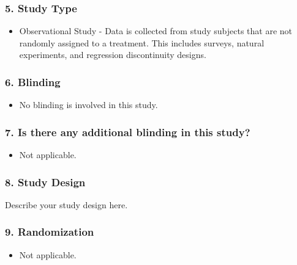 \documentclass[
]{article}
\providecommand{\tightlist}{%
  \setlength{\itemsep}{0pt}\setlength{\parskip}{0pt}}
\begin{document}
\hypertarget{study-type}{%
\subsubsection{5. Study Type}\label{study-type}}

\begin{itemize}
\tightlist
\item
  Observational Study - Data is collected from study subjects that are
  not randomly assigned to a treatment. This includes surveys, natural
  experiments, and regression discontinuity designs.
\end{itemize}

\hypertarget{blinding}{%
\subsubsection{6. Blinding}\label{blinding}}

\begin{itemize}
\tightlist
\item
  No blinding is involved in this study.
\end{itemize}

\hypertarget{is-there-any-additional-blinding-in-this-study}{%
\subsubsection{7. Is there any additional blinding in this
study?}\label{is-there-any-additional-blinding-in-this-study}}

\begin{itemize}
\tightlist
\item
  Not applicable.
\end{itemize}

\hypertarget{study-design}{%
\subsubsection{8. Study Design}\label{study-design}}

Describe your study design here.

\hypertarget{randomization}{%
\subsubsection{9. Randomization}\label{randomization}}

\begin{itemize}
\tightlist
\item
  Not applicable.
\end{itemize}
\end{document}
